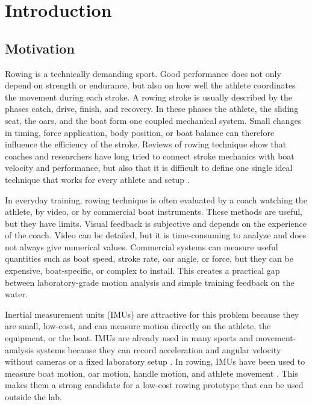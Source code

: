 \chapter{Introduction} %

\section{Motivation}

Rowing is a technically demanding sport. Good performance does not only depend on strength or endurance, but also on how well the athlete coordinates the movement during each stroke. A rowing stroke is usually described by the phases catch, drive, finish, and recovery. In these phases the athlete, the sliding seat, the oars, and the boat form one coupled mechanical system. Small changes in timing, force application, body position, or boat balance can therefore influence the efficiency of the stroke. Reviews of rowing technique show that coaches and researchers have long tried to connect stroke mechanics with boat velocity and performance, but also that it is difficult to define one single ideal technique that works for every athlete and setup \cite{soper_towards_2004}.

In everyday training, rowing technique is often evaluated by a coach watching the athlete, by video, or by commercial boat instruments. These methods are useful, but they have limits. Visual feedback is subjective and depends on the experience of the coach. Video can be detailed, but it is time-consuming to analyze and does not always give numerical values. Commercial systems can measure useful quantities such as boat speed, stroke rate, oar angle, or force, but they can be expensive, boat-specific, or complex to install. This creates a practical gap between laboratory-grade motion analysis and simple training feedback on the water.

Inertial measurement units (IMUs) are attractive for this problem because they are small, low-cost, and can measure motion directly on the athlete, the equipment, or the boat. IMUs are already used in many sports and movement-analysis systems because they can record acceleration and angular velocity without cameras or a fixed laboratory setup \cite{arlotti_benefits_2022}. In rowing, IMUs have been used to measure boat motion, oar motion, handle motion, and athlete movement \cite{llosa_remote_2009,junker_sensor-based_2015,hohmuth_wireless_2023,rodriguez_mendoza_wearable_2024}. This makes them a strong candidate for a low-cost rowing prototype that can be used outside the lab.

